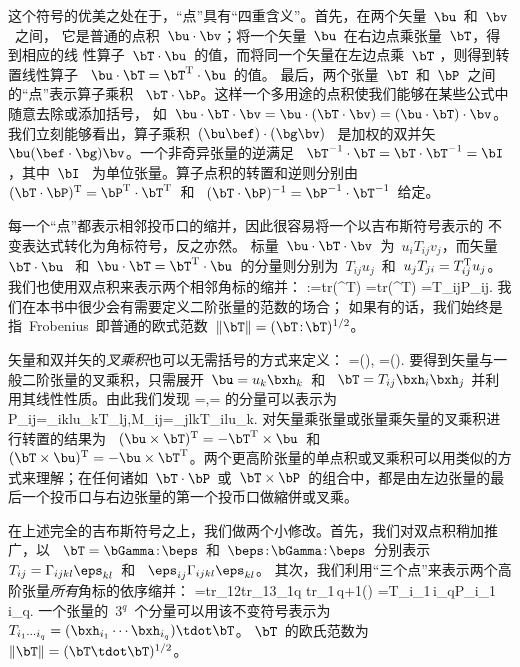 这个符号的优美之处在于，“点”具有“四重含义”。首先，在两个矢量~$\bu$~和~$\bv$~之间，
它是普通的点积~$\bu\cdot\bv$；将一个矢量~$\bu$~在右边点乘张量~$\bT$，得到相应的线
性算子~$\bT\cdot\bu$~的值，而将同一个矢量在左边点乘~$\bT$ ，则得到转置线性算子~ $\bu\cdot\bT=\bT^{\rm T}\cdot\bu$~的值。
最后，两个张量~$\bT$~和~$\bP$~之间的“点”表示算子乘积~ $\bT\cdot\bP$。这样一个多用途的点积使我们能够在某些公式中随意去除或添加括号，
如~$\bu\cdot\bT\cdot\bv=\bu\cdot(\bT\cdot\bv)=(\bu\cdot\bT)\cdot\bv$。
我们立刻能够看出，算子乘积~$(\bu\bef)\cdot(\bg\bv)$~
是加权的双并矢~$\bu(\bef\cdot\bg)\bv$。一个非奇异张量的逆满足~ $\bT^{-1}\cdot\bT=\bT\cdot\bT^{-1}=\bI$，其中~$\bI$~ 为单位张量。算子点积的转置和逆则分别由~$(\bT\cdot\bP)^{\rm T}=\bP^{\rm T}\cdot\bT^{\rm T}$~和~
$(\bT\cdot\bP)^{-1}=\bP^{-1}\cdot\bT^{-1}$~给定。

每一个“点”都表示相邻投币口的缩并，因此很容易将一个以吉布斯符号表示的
不变表达式转化为角标符号，反之亦然。
标量~$\bu\cdot\bT\cdot\bv$~为~$u_iT_{ij}v_j$，而矢量~$\bT\cdot\bu$~
和~$\bu\cdot\bT=\bT^{\rm T}\cdot\bu$~的分量则分别为~$T_{ij}u_j$~和~$u_jT_{ji}=T^{\rm T}_{ij}u_j$。
%
我们也使用双点积来表示两个相邻角标的缩并：
\eq \label{A.dubdot}
\bT\!:\!\bP={\rm tr}(\bT^{\rm T}\cdot\bP)
={\rm tr}(\bT\cdot\bP^{\rm T})
=T_{ij}P_{ij}.
\en
我们在本书中很少会有需要定义二阶张量的范数的场合；
如果有的话，我们始终是指~Frobenius~即普通的欧式范数~$\|\bT\|=(\bT\!:\!\bT)^{1/2}$。
%
%

矢量和双并矢的{\em 叉乘积\/}也可以无需括号的方式来定义：
%
\eq \label{A.cross}
\bu\times\bv\bw=(\bu\times\bv)\bw,\qquad
\bv\bw\times\bu=\bv(\bw\times\bu).
\en
要得到矢量与一般二阶张量的叉乘积，只需展开~$\bu=u_k\bxh_k$~和~ $\bT=T_{ij}\bxh_i\bxh_j$
并利用其线性性质。由此我们发现
\eq
\bP=\bu\times\bT,\qquad\bM=\bT\times\bu
\en
的分量可以表示为
\eq
P_{ij}=\eps_{ikl}u_kT_{lj},\qquad M_{ij}=\eps_{jlk}T_{il}u_k.
\en
对矢量乘张量或张量乘矢量的叉乘积进行转置的结果为~
$(\bu\times\bT)^{\rm T}=-\bT^{\rm T}\times\bu$~和~
$(\bT\times\bu)^{\rm T}=-\bu\times\bT^{\rm T}$。两个更高阶张量的单点积或叉乘积可以用类似的方式来理解；在任何诸如~$\bT\cdot\bP$~或~$\bT\times\bP$~的组合中，都是由左边张量的最后一个投币口与右边张量的第一个投币口做縮併或叉乘。

在上述完全的吉布斯符号之上，我们做两个小修改。首先，我们对双点积稍加推广，以~ $\bT=\bGamma\!:\!\beps$~和~$\beps\!:\!
\bGamma\!:\!\beps$~分别表示~$T_{ij}=\Gamma_{ijkl}\eps_{kl}$~和~ $\eps_{ij}\Gamma_{ijkl}\eps_{kl}$。
其次，我们利用“三个点”来表示两个高阶张量{\em 所有\/}角标的依序缩并：
%
\eq \label{A.tdotdef}
\bT\tdot\bP={\rm tr}_{12}{\rm tr}_{13}_{1q}
{\rm tr}_{1\,q+1}(\bT\bP)
=T_{i_1\cdots\,i_q}P_{i_1\cdots\,i_q}.
\en
一个张量的~$3^q$~个分量可以用该不变符号表示为~$T_{i_1\cdots i_q}
=(\bxh_{i_1}\cdots\bxh_{i_q})\tdot\bT$。
%
%
$\bT$~的欧氏范数为~$\|\bT\|=(\bT\tdot\bT)^{1/2}$。


